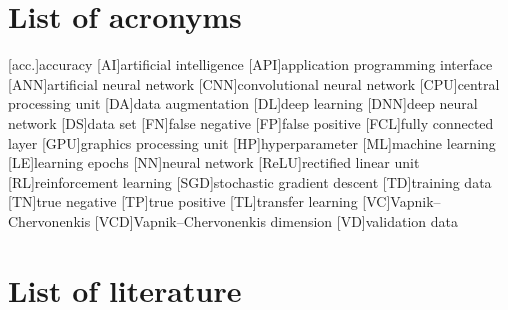 \documentclass[10pt]{article}
\begin{document}
	\section*{List of acronyms}
		\begin{acronym}[General]
			\setlength{\itemsep}{0em}
			[acc.]{accuracy}
			[AI]{artificial intelligence}
			[API]{application programming interface}
			[ANN]{artificial neural network}
			[CNN]{convolutional neural network}
			[CPU]{central processing unit}
			[DA]{data augmentation}
			[DL]{deep learning}
			[DNN]{deep neural network}
			[DS]{data set}
			[FN]{false negative}
			[FP]{false positive}
			[FCL]{fully connected layer}
			[GPU]{graphics processing unit}
			[HP]{hyperparameter}
			[ML]{machine learning}
			[LE]{learning epochs}
			[NN]{neural network}
			[ReLU]{rectified linear unit}
			[RL]{reinforcement learning}
			[SGD]{stochastic gradient descent}
			[TD]{training data}
			[TN]{true negative}
			[TP]{true positive}
			[TL]{transfer learning}
			[VC]{Vapnik–Chervonenkis}
			[VCD]{Vapnik–Chervonenkis dimension}
			[VD]{validation data}
		\end{acronym}
		
		
		
	\pagebreak	
	\section*{List of literature}
		\printbibliography[heading=none]
	
\end{document}
